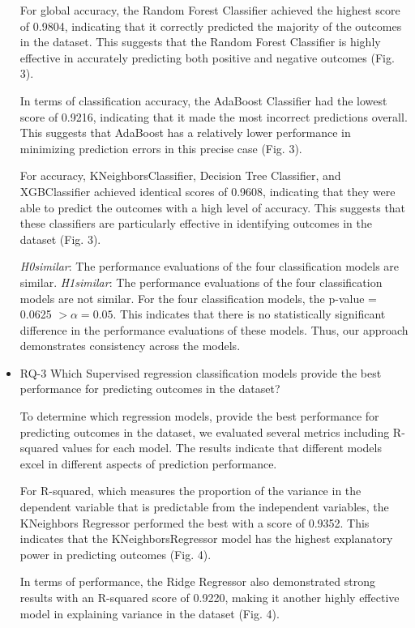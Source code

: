 \documentclass{article}
\begin{document}
\begin{multicols}{2}
\begin{itemize}
For global accuracy, the Random Forest Classifier achieved the highest score of 0.9804, indicating that it correctly predicted the majority of the outcomes in the dataset. This suggests that the Random Forest Classifier is highly effective in accurately predicting both positive and negative outcomes (Fig. 3).

In terms of classification accuracy, the AdaBoost Classifier had the lowest score of 0.9216, indicating that it made the most incorrect predictions overall. This suggests that AdaBoost has a relatively lower performance in minimizing prediction errors in this precise case (Fig. 3).

For accuracy, KNeighborsClassifier, Decision Tree Classifier, and XGBClassifier achieved identical scores of 0.9608, indicating that they were able to predict the outcomes with a high level of accuracy. This suggests that these classifiers are particularly effective in identifying outcomes in the dataset (Fig. 3).

\textit{H0similar}: The performance evaluations of the four classification models are similar. \textit{H1similar}: The performance evaluations of the four classification models are not similar. For the four classification models, the p-value = 0.0625 \( > \alpha = 0.05 \). This indicates that there is no statistically significant difference in the performance evaluations of these models. Thus, our approach demonstrates consistency across the models.

    \item RQ-3	Which Supervised regression classification models provide the best performance for predicting outcomes in the dataset?
    
To determine which regression models, provide the best performance for predicting outcomes in the dataset, we evaluated several metrics including R-squared values for each model. The results indicate that different models excel in different aspects of prediction performance.

For R-squared, which measures the proportion of the variance in the dependent variable that is predictable from the independent variables, the KNeighbors Regressor performed the best with a score of 0.9352. This indicates that the KNeighborsRegressor model has the highest explanatory power in predicting outcomes (Fig. 4).

In terms of performance, the Ridge Regressor also demonstrated strong results with an R-squared score of 0.9220, making it another highly effective model in explaining variance in the dataset (Fig. 4).


\end{itemize}
\end{multicols}
\end{document}
